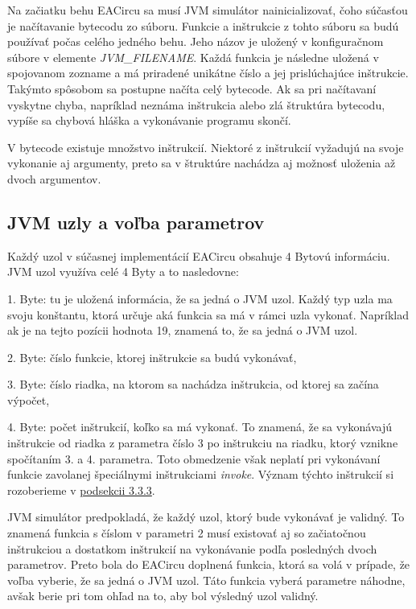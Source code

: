 Na začiatku behu EACircu sa musí JVM simulátor nainicializovať, čoho súčasťou je načítavanie bytecodu zo súboru. Funkcie a inštrukcie z tohto súboru sa budú používať počas celého jedného behu. Jeho názov je uložený v konfiguračnom súbore v elemente \textit{JVM\_FILENAME}. Každá funkcia je následne uložená v spojovanom zozname a má priradené unikátne číslo a jej prislúchajúce inštrukcie. Takýmto spôsobom sa postupne načíta celý bytecode. Ak sa pri načítavaní vyskytne chyba, napríklad neznáma inštrukcia alebo zlá štruktúra bytecodu, vypíše sa chybová hláška a vykonávanie programu skončí.

V bytecode existuje množstvo inštrukcií. Niektoré z inštrukcií vyžadujú na svoje vykonanie aj argumenty, preto sa v štruktúre nachádza aj možnosť uloženia až dvoch argumentov.

\subsection{JVM uzly a voľba parametrov}
\label{subsec:jvm-nodes}

Každý uzol v súčasnej implementácií EACircu obsahuje 4 Bytovú informáciu. JVM uzol využíva celé 4 Byty a to nasledovne: \vspace{0pt}

\begin{myItemize}
	\item 1. Byte: tu je uložená informácia, že sa jedná o JVM uzol. Každý typ uzla ma svoju konštantu, ktorá určuje aká funkcia sa má v rámci uzla vykonať. Napríklad ak je na tejto pozícii hodnota 19, znamená to, že sa jedná o JVM uzol.
	\item 2. Byte: číslo funkcie, ktorej inštrukcie sa budú vykonávať,
	\item 3. Byte: číslo riadka, na ktorom sa nachádza inštrukcia, od ktorej sa začína výpočet,
	\item 4. Byte: počet inštrukcií, koľko sa má vykonať. To znamená, že sa vykonávajú inštrukcie od riadka z parametra číslo 3 po inštrukciu na riadku, ktorý vznikne spočítaním 3. a 4. parametra. Toto obmedzenie však neplatí pri vykonávaní funkcie zavolanej špeciálnymi inštrukciami \textit{invoke}. Význam týchto inštrukcií si rozoberieme v \hyperref[subsec:emulating-ins]{podsekcii 3.3.3}.
\end{myItemize}
JVM simulátor predpokladá, že každý uzol, ktorý bude vykonávať je validný. To znamená funkcia s číslom v parametri 2 musí existovať aj so začiatočnou inštrukciou a dostatkom inštrukcií na vykonávanie podľa posledných dvoch parametrov. Preto bola do EACircu doplnená funkcia, ktorá sa volá v prípade, že voľba vyberie, že sa jedná o JVM uzol. Táto funkcia vyberá parametre náhodne, avšak berie pri tom ohľad na to, aby bol výsledný uzol validný.

